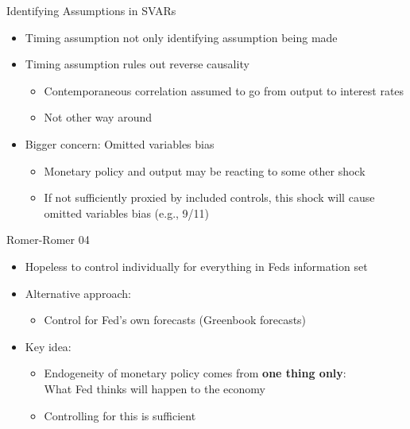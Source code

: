 \documentclass[11pt,aspectratio=169,xcolor={dvipsnames},hyperref={pdftex,pdfpagemode=UseNone,hidelinks,pdfdisplaydoctitle=true},usepdftitle=false]{beamer}
\begin{document}
\begin{frame}{Identifying Assumptions in SVARs}
\begin{itemize}
\itemsep1em 
\item Timing assumption not only identifying assumption being made
\item Timing assumption rules out reverse causality
\begin{itemize}
\item Contemporaneous correlation assumed to go from output to interest rates
\item Not other way around 
\end{itemize}
\item Bigger concern: Omitted variables bias
\begin{itemize}
\item Monetary policy and output may be reacting to some other shock
\item If not sufficiently proxied by included controls, this shock will cause \\ omitted variables bias (e.g., 9/11)
\end{itemize}
\end{itemize}
\end{frame}

\begin{frame}{Romer-Romer 04}
\begin{itemize}
\itemsep1em 
\item Hopeless to control individually for everything in Feds information set
\item Alternative approach:
\begin{itemize}
\item Control for Fed's own forecasts (Greenbook forecasts)
\end{itemize}
\item Key idea: 
\begin{itemize}
\item Endogeneity of monetary policy comes from \textbf{one thing only}: \\ What Fed thinks will happen to the economy
\item Controlling for this is sufficient
\end{itemize}
\end{itemize}
\end{frame}
\end{document}
